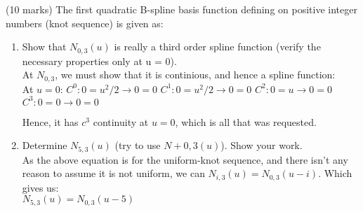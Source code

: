 (10 marks) The first quadratic B-spline basis function defining on positive integer numbers (knot sequence) is given as: \\
\begin{enumerate}
\item Show that $N_{0,3} (u)$ is really a third order spline function (verify the necessary properties only at u = 0). \\

At $N_{0,3}$, we must show that it is continious, and hence a spline function: \\
At $u=0$:
$C^0 : 0 = u^2/2 \to  0  = 0$
$C^1 : 0 = u^2/2 \to  0  = 0$
$C^2 : 0 = u \to 0 = 0$
$C^3 : 0 = 0 \to 0 = 0$

Hence, it has $c^3$ continuity at $u=0$, which is all that was requested. \\

\item Determine $N_{5,3} (u)$ (try to use $N+{0,3} (u)$). Show your work. \\
As the above equation is for the uniform-knot sequence, and there isn't any reason to assume it is not uniform, we can $N_{i,3}(u) = N_{0,3}(u-i)$. Which gives us: \\
$N_{5,3}(u) = N_{0,3}(u - 5)$ \\
\end{enumerate}
